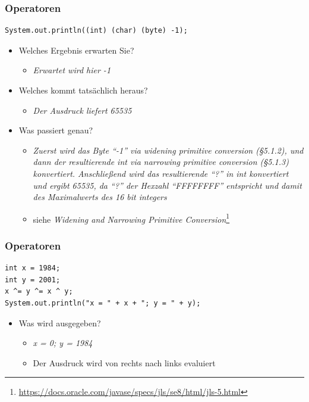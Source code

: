 \documentclass{beamer}
\begin{document}
\begin{frame}[fragile]
\frametitle{Operatoren}

\begin{lstlisting}
System.out.println((int) (char) (byte) -1);
\end{lstlisting}

\begin{itemize}
\item Welches Ergebnis erwarten Sie?
	\begin{itemize}
	\item \textit{Erwartet wird hier -1}
	\end{itemize}
\item Welches kommt tats\"achlich heraus?
	\begin{itemize}
	\item \textit{Der Ausdruck liefert 65535}
	\end{itemize}
\item Was passiert genau?
	\begin{itemize}
	\item \textit{Zuerst wird das Byte ``-1'' via widening primitive conversion (§5.1.2), und dann der resultierende int via narrowing primitive conversion (§5.1.3) konvertiert. Anschließend wird das resultierende ``?'' in int konvertiert und ergibt 65535, da ``?'' der Hexzahl ``FFFFFFFF'' entspricht und damit des Maximalwerts des 16 bit integers}
	\item siehe \textit{Widening and Narrowing Primitive Conversion}\footnote{\href{https://docs.oracle.com/javase/specs/jls/se8/html/jls-5.html}{https://docs.oracle.com/javase/specs/jls/se8/html/jls-5.html}}
	\end{itemize}
\end{itemize}

\end{frame}

\begin{frame}[fragile]
\frametitle{Operatoren}

\begin{lstlisting}
int x = 1984;
int y = 2001;
x ^= y ^= x ^ y;
System.out.println("x = " + x + "; y = " + y);
\end{lstlisting}

\begin{itemize}
\item Was wird ausgegeben?
	\begin{itemize}
	\item \textit{x = 0; y = 1984}
	\item Der Ausdruck wird von rechts nach links evaluiert
	\end{itemize}
\end{itemize}

\end{frame}
\end{document}

